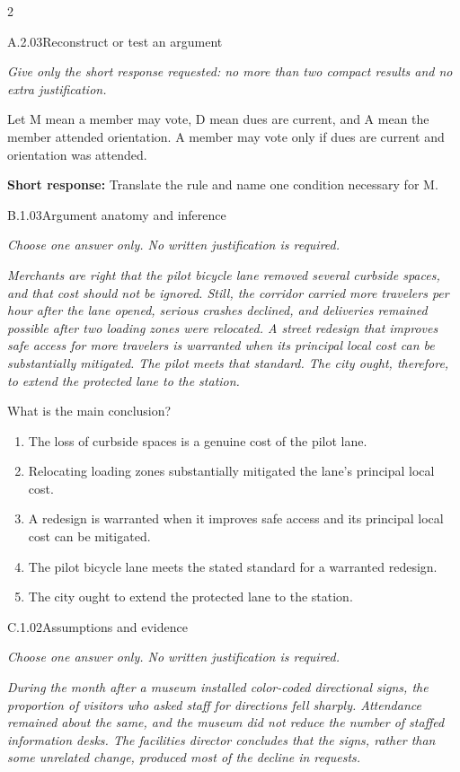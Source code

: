 \documentclass[9pt]{extarticle}
\newcommand{\choice}[1]{\item #1}
\begin{document}
\begin{multicols}{2}
\begin{DenseCoreProblem}{A.2.03}{Reconstruct or test an argument}
{\scriptsize\textit{Give only the short response requested: no more than two compact results and no extra justification.}\par}
Let M mean a member may vote, D mean dues are current, and A mean the member attended orientation. A member may vote only if dues are current and orientation was attended.

\textbf{Short response:} Translate the rule and name one condition necessary for M.
\end{DenseCoreProblem}
\begin{DenseCoreProblem}{B.1.03}{Argument anatomy and inference}
{\scriptsize\textit{Choose one answer only. No written justification is required.}\par}
\emph{Merchants are right that the pilot bicycle lane removed several curbside spaces, and that cost should not be ignored. Still, the corridor carried more travelers per hour after the lane opened, serious crashes declined, and deliveries remained possible after two loading zones were relocated. A street redesign that improves safe access for more travelers is warranted when its principal local cost can be substantially mitigated. The pilot meets that standard. The city ought, therefore, to extend the protected lane to the station.}

What is the main conclusion?
\begin{enumerate}[label=(\alph*)]
  \choice{The loss of curbside spaces is a genuine cost of the pilot lane.}
  \choice{Relocating loading zones substantially mitigated the lane's principal local cost.}
  \choice{A redesign is warranted when it improves safe access and its principal local cost can be mitigated.}
  \choice{The pilot bicycle lane meets the stated standard for a warranted redesign.}
  \choice{The city ought to extend the protected lane to the station.}
\end{enumerate}
\end{DenseCoreProblem}
\columnbreak
\begin{DenseCoreProblem}{C.1.02}{Assumptions and evidence}
{\scriptsize\textit{Choose one answer only. No written justification is required.}\par}
\emph{During the month after a museum installed color-coded directional signs, the proportion of visitors who asked staff for directions fell sharply. Attendance remained about the same, and the museum did not reduce the number of staffed information desks. The facilities director concludes that the signs, rather than some unrelated change, produced most of the decline in requests.}


\end{DenseCoreProblem}
\end{multicols}
\end{document}
